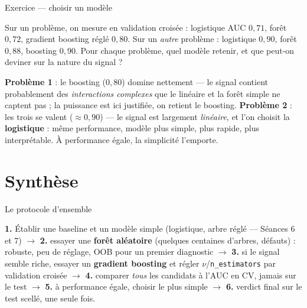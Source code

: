 \documentclass[aspectratio=169,11pt]{beamer}
\begin{document}
\begin{frame}{Exercice — choisir un modèle}
\begin{ucadrec}[Énoncé]
{\small Sur un problème, on mesure en validation croisée : logistique AUC $0{,}71$, forêt $0{,}72$, gradient boosting réglé $0{,}80$. Sur un \emph{autre} problème : logistique $0{,}90$, forêt $0{,}88$, boosting $0{,}90$. Pour chaque problème, quel modèle retenir, et que peut-on deviner sur la nature du signal ?}
\end{ucadrec}
\pause
\begin{ucadex}[Correction]
{\small \textbf{Problème 1} : le boosting ($0{,}80$) domine nettement — le signal contient probablement des \emph{interactions complexes} que le linéaire et la forêt simple ne captent pas ; la puissance est ici justifiée, on retient le boosting. \textbf{Problème 2} : les trois se valent ($\approx 0{,}90$) — le signal est largement \emph{linéaire}, et l'on choisit la \textbf{logistique} : même performance, modèle plus simple, plus rapide, plus interprétable. À performance égale, la simplicité l'emporte.}
\end{ucadex}
\end{frame}

\section{Synthèse}

\begin{frame}{Le protocole d'ensemble}
\begin{ucadret}
{\small \textbf{1.} Établir une baseline et un modèle simple (logistique, arbre réglé — Séances 6 et 7) $\to$ \textbf{2.} essayer une \textbf{forêt aléatoire} (quelques centaines d'arbres, défauts) : robuste, peu de réglage, OOB pour un premier diagnostic $\to$ \textbf{3.} si le signal semble riche, essayer un \textbf{gradient boosting} et régler $\nu$/\texttt{n\_estimators} par validation croisée $\to$ \textbf{4.} comparer \emph{tous} les candidats à l'AUC en CV, jamais sur le test $\to$ \textbf{5.} à performance égale, choisir le plus simple $\to$ \textbf{6.} verdict final sur le test scellé, une seule fois.}
\end{ucadret}
\end{frame}
\end{document}
